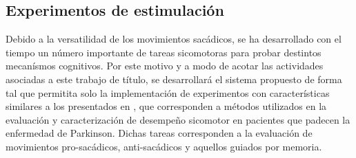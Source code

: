 \documentclass[../main.tex]{subfiles}
\begin{document}
			\begin{table}[H]\begin{center}\footnotesize{
				\caption[Comparativa de software de estimulación]{Comparativa de software de estimulación \cite{website:software_presentation, website:software_psychopy, website:software_psychotoolbox, website:software_vissionegg}}
				\label{tbl:systems_compare}
			}\end{center}\end{table}

		\newpage
		\subsection{Experimentos de estimulación}
		\label{sub:02_experimentos_de_estimulacion}

			Debido a la versatilidad de los movimientos sacádicos, se ha desarrollado con el tiempo un número importante de tareas sicomotoras para probar destintos mecanísmos cognitivos. Por este motivo y a modo de acotar las actividades asociadas a este trabajo de título, se desarrollará el sistema propuesto de forma tal que permitita solo la implementación de experimentos con características similares a los presentados en \cite{article:tests_1, article:tests_2, article:tests_3, article:tests_4}, que corresponden a métodos utilizados en la evaluación y caracterización de desempeño sicomotor en pacientes que padecen la enfermedad de Parkinson. Dichas tareas corresponden a la evaluación de movimientos pro-sacádicos, anti-sacádicos y aquellos guiados por memoria.
\end{document}
